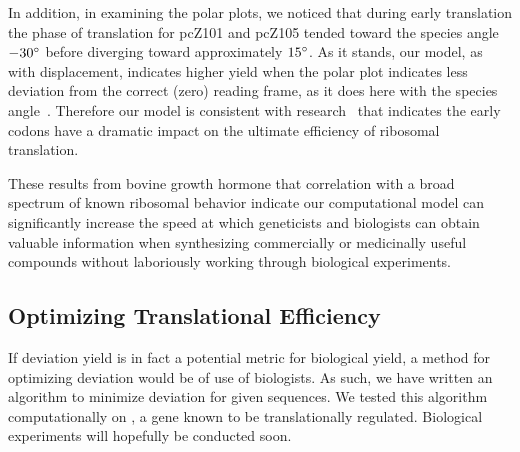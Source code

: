 \documentclass[12pt, draft]{article}
\numberwithin{equation}{section}
\begin{document}
In addition, in examining the polar plots, we noticed that during
early translation the phase of translation for pcZ101 and pcZ105 tended toward the species
angle $-30^\circ$ before diverging toward approximately $15^\circ$. As
it stands, our model, as with displacement, indicates higher yield when the polar plot
indicates less deviation from the correct (zero) reading frame, as it
does here with the species angle~\cite{lalit:mechanics}. Therefore our
model is consistent with research~\cite{bgh:initiation} that indicates
the early codons have a dramatic impact on the ultimate efficiency of
ribosomal translation.

These results from bovine growth hormone that correlation with a broad
spectrum of known ribosomal behavior indicate our computational model
can significantly increase the speed at which geneticists and
biologists can obtain valuable information when synthesizing
commercially or medicinally useful compounds without laboriously
working through biological experiments.

\subsection{Optimizing Translational Efficiency}

If deviation yield is in fact a potential metric for biological yield,
a method for optimizing deviation would be of use of biologists.  As such,
we have written an algorithm to minimize deviation for given sequences.
We tested this algorithm computationally on \rpoS, a gene known to
be translationally regulated.  Biological experiments will hopefully be
conducted soon.

\end{document}
